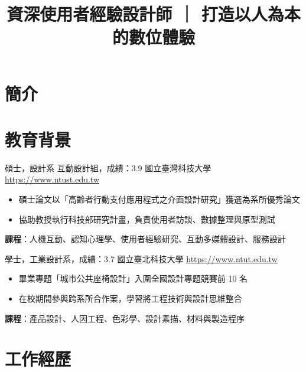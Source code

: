\documentclass[a4paper, serif, 10pt]{moderncv}
\title{資深使用者經驗設計師 ｜ 打造以人為本的數位體驗}
\begin{document}
\maketitle

\section{簡介}

\section{教育背景}

        {碩士，設計系 互動設計組，成績：3.9}
        {國立臺灣科技大學}
        {\url{https://www.ntust.edu.tw}}
        {}
        {\begin{itemize}
\item 碩士論文以「高齡者行動支付應用程式之介面設計研究」獲選為系所優秀論文
\item 協助教授執行科技部研究計畫，負責使用者訪談、數據整理與原型測試
\end{itemize}
\textbf{課程}：人機互動、認知心理學、使用者經驗研究、互動多媒體設計、服務設計}

        {學士，工業設計系，成績：3.7}
        {國立臺北科技大學}
        {\url{https://www.ntut.edu.tw}}
        {}
        {\begin{itemize}
\item 畢業專題「城市公共座椅設計」入圍全國設計專題競賽前 10 名
\item 在校期間參與跨系所合作案，學習將工程技術與設計思維整合
\end{itemize}
\textbf{課程}：產品設計、人因工程、色彩學、設計素描、材料與製造程序}
\section{工作經歷}
\end{document}
